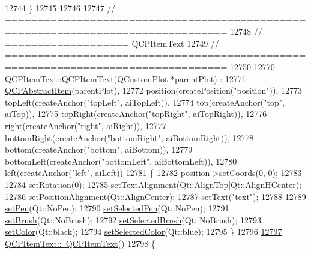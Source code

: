 \begin{DoxyCode}
12744 \}
12745 
12746 
12747 \textcolor{comment}{// ================================================================================}
12748 \textcolor{comment}{// =================== QCPItemText}
12749 \textcolor{comment}{// ================================================================================}
12750 
\hypertarget{a00115_source_l12770}{}\hyperlink{a00041_a77ff96a2972a00872ff8f8c67143abbe}{12770} \hyperlink{a00041_a77ff96a2972a00872ff8f8c67143abbe}{QCPItemText::QCPItemText}(\hyperlink{a00030_d8/d00/a00186}{QCustomPlot} *parentPlot) :
12771   \hyperlink{a00022}{QCPAbstractItem}(parentPlot),
12772   position(createPosition(\textcolor{stringliteral}{"position"})),
12773   topLeft(createAnchor(\textcolor{stringliteral}{"topLeft"}, aiTopLeft)),
12774   top(createAnchor(\textcolor{stringliteral}{"top"}, aiTop)),
12775   topRight(createAnchor(\textcolor{stringliteral}{"topRight"}, aiTopRight)),
12776   right(createAnchor(\textcolor{stringliteral}{"right"}, aiRight)),
12777   bottomRight(createAnchor(\textcolor{stringliteral}{"bottomRight"}, aiBottomRight)),
12778   bottom(createAnchor(\textcolor{stringliteral}{"bottom"}, aiBottom)),
12779   bottomLeft(createAnchor(\textcolor{stringliteral}{"bottomLeft"}, aiBottomLeft)),
12780   left(createAnchor(\textcolor{stringliteral}{"left"}, aiLeft))
12781 \{
12782   \hyperlink{a00041_a0d228a00e819022b5690c65762721129}{position}->\hyperlink{a00038_aa988ba4e87ab684c9021017dcaba945f}{setCoords}(0, 0);
12783   
12784   \hyperlink{a00041_a4bcc10cd97952c3f749d75824b5077f0}{setRotation}(0);
12785   \hyperlink{a00041_ab5bc0684c4d1bed81949a11b34dba478}{setTextAlignment}(Qt::AlignTop|Qt::AlignHCenter);
12786   \hyperlink{a00041_a781cdf8c640fc6a055dcff1e675c8c7a}{setPositionAlignment}(Qt::AlignCenter);
12787   \hyperlink{a00041_a3dacdda0ac88f99a05b333b977c48747}{setText}(\textcolor{stringliteral}{"text"});
12788   
12789   \hyperlink{a00041_a9b9ec6eea0eb0603977ff84d4c78d0a3}{setPen}(Qt::NoPen);
12790   \hyperlink{a00041_a291febe586f0da3f1c392e77bef4aa20}{setSelectedPen}(Qt::NoPen);
12791   \hyperlink{a00041_a1c7e131516df2ed8d941ef31240ded8e}{setBrush}(Qt::NoBrush);
12792   \hyperlink{a00041_a6b8377eeb2af75eb9528422671ac16cb}{setSelectedBrush}(Qt::NoBrush);
12793   \hyperlink{a00041_aa51efc0841fe52da9eaf8aff6fc8a8b2}{setColor}(Qt::black);
12794   \hyperlink{a00041_ae7ba0bdb75c897b028388e45bfd435fa}{setSelectedColor}(Qt::blue);
12795 \}
12796 
\hypertarget{a00115_source_l12797}{}\hyperlink{a00041_a1efd41ca53d49042d4f4b63cf9615cb6}{12797} \hyperlink{a00041_a1efd41ca53d49042d4f4b63cf9615cb6}{QCPItemText::~QCPItemText}()
12798 \{

\end{DoxyCode}
